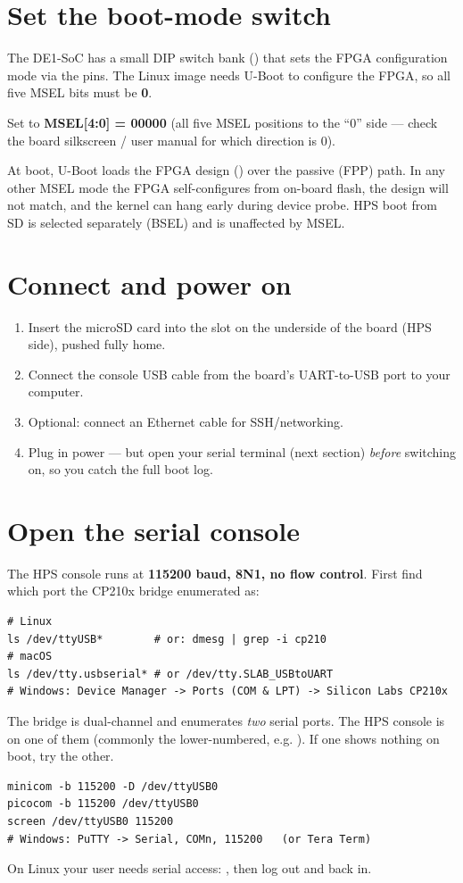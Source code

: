 \section{Set the boot-mode switch}
The DE1-SoC has a small DIP switch bank () that sets the FPGA
configuration mode via the  pins. The Linux image needs U-Boot to
configure the FPGA, so all five MSEL bits must be \textbf{0}.
\begin{warn}
Set  to \textbf{MSEL[4:0] = 00000} (all five MSEL positions to the ``0''
side --- check the board silkscreen / user manual for which direction is 0).
\end{warn}
At boot, U-Boot loads the FPGA design () over the passive
(FPP) path. In any other MSEL mode the FPGA self-configures from on-board flash,
the design will not match, and the kernel can hang early during device probe. HPS
boot from SD is selected separately (BSEL) and is unaffected by MSEL.

\section{Connect and power on}
\begin{enumerate}
  \item Insert the microSD card into the slot on the underside of the board (HPS side), pushed fully home.
  \item Connect the console USB cable from the board's UART-to-USB port to your computer.
  \item Optional: connect an Ethernet cable for SSH/networking.
  \item Plug in power --- but open your serial terminal (next section) \emph{before} switching on, so you catch the full boot log.
\end{enumerate}

\section{Open the serial console}
The HPS console runs at \textbf{115200 baud, 8N1, no flow control}. First find
which port the CP210x bridge enumerated as:
\begin{lstlisting}
# Linux
ls /dev/ttyUSB*        # or: dmesg | grep -i cp210
# macOS
ls /dev/tty.usbserial* # or /dev/tty.SLAB_USBtoUART
# Windows: Device Manager -> Ports (COM & LPT) -> Silicon Labs CP210x
\end{lstlisting}
\begin{tip}
The bridge is dual-channel and enumerates \emph{two} serial ports. The HPS console
is on one of them (commonly the lower-numbered, e.g. ). If one shows
nothing on boot, try the other.
\end{tip}
\begin{lstlisting}
minicom -b 115200 -D /dev/ttyUSB0
picocom -b 115200 /dev/ttyUSB0
screen /dev/ttyUSB0 115200
# Windows: PuTTY -> Serial, COMn, 115200   (or Tera Term)
\end{lstlisting}
\begin{note}
On Linux your user needs serial access: ,
then log out and back in.
\end{note}

